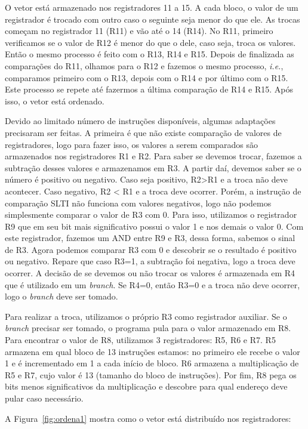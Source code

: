 \documentclass[11pt,a4paper,titlepage]{article}
\begin{document}
O vetor está armazenado nos registradores 11 a 15. A cada bloco, o valor de um registrador é trocado com outro caso o seguinte seja menor do que ele. As trocas começam no registrador 11 (R11) e vão até o 14 (R14). No R11, primeiro verificamos se o valor de R12 é menor do que o dele, caso seja, troca os valores. Então o mesmo processo é feito com o R13, R14 e R15. Depois de finalizada as comparações do R11, olhamos para o R12 e fazemos o mesmo processo, \textit{i.e.}, comparamos primeiro com o R13, depois com o R14 e por último com o R15. Este processo se repete até fazermos a última comparação de R14 e R15. Após isso, o vetor está ordenado.

Devido ao limitado número de instruções disponíveis, algumas adaptações precisaram ser feitas. A primeira é que não existe comparação de valores de registradores, logo para fazer isso, os valores a serem comparados são armazenados nos registradores R1 e R2. Para saber se devemos trocar, fazemos a subtração desses valores e armazenamos em R3. A partir daí, devemos saber se o número é positivo ou negativo. Caso seja positivo, R2>R1 e a troca não deve acontecer. Caso negativo, R2 < R1 e a troca deve ocorrer. Porém, a instrução de comparação SLTI não funciona com valores negativos, logo não podemos simplesmente comparar o valor de R3 com 0. Para isso, utilizamos o registrador R9 que em seu bit mais significativo possui o valor 1 e nos demais o valor 0. Com este registrador, fazemos um AND entre R9 e R3, dessa forma, sabemos o sinal de R3. Agora podemos comparar R3 com 0 e descobrir se o resultado é positivo ou negativo. Repare que caso R3=1, a subtração foi negativa, logo a troca deve ocorrer. A decisão de se devemos ou não trocar os valores é armazenada em R4 que é utilizado em um \textit{branch}. Se R4=0, então R3=0 e a troca não deve ocorrer, logo o \textit{branch} deve ser tomado.

Para realizar a troca, utilizamos o próprio R3 como registrador auxiliar. Se o \textit{branch} precisar ser tomado, o programa pula para o valor armazenado em R8. Para encontrar o valor de R8, utilizamos 3 registradores: R5, R6 e R7. R5 armazena em qual bloco de 13 instruções estamos: no primeiro ele recebe o valor 1 e é incrementado em 1 a cada início de bloco. R6 armazena a multiplicação de R5 e R7, cujo valor é 13 (tamanho do bloco de instruções). Por fim, R8 pega os bits menos significativos da multiplicação e descobre para qual endereço deve pular caso necessário.

A Figura~\ref{fig:ordena1} mostra como o vetor está distribuído nos registradores:
\end{document}
